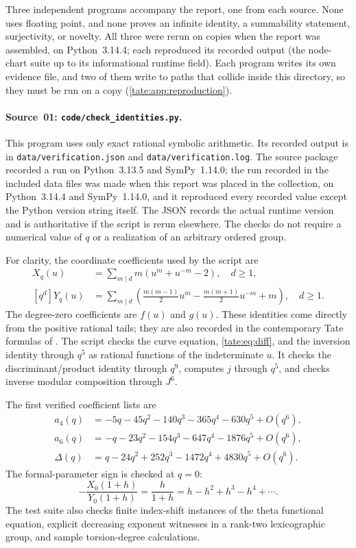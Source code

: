 \documentclass[11pt,letterpaper]{article}
\theoremstyle{definition}
\newcommand{\file}[1]{\nolinkurl{#1}}
\begin{document}
Three independent programs accompany the report, one from each source.
None uses floating point, and none proves an infinite identity, a
summability statement, surjectivity, or novelty. All three were rerun on
copies when the report was assembled, on Python~3.14.4; each reproduced its
recorded output (the node-chart suite up to its informational runtime
field). Each program writes its own evidence file, and two of them write to
paths that collide inside this directory, so they must be run on a copy
(\cref{tate:app:reproduction}).

\paragraph{Source~01: \texttt{code/check\_identities.py}.}
This program uses only
exact rational symbolic arithmetic. Its recorded output is in
\file{data/verification.json} and \file{data/verification.log}.
The source package recorded a run on Python~3.13.5 and SymPy~1.14.0; the
run recorded in the included data files was made when this report was
placed in the collection, on Python~3.14.4 and SymPy~1.14.0, and it
reproduced every recorded value except the Python version string itself.
The JSON records the actual
runtime version and is authoritative if the script is rerun elsewhere.
The checks do not require a numerical value of $q$ or a realization of
an arbitrary ordered group.

For clarity, the coordinate coefficients used by the script are
\begin{align}
 [q^d]X_q(u)&=\sum_{m\mid d}m(u^m+u^{-m}-2),\quad d\ge1,
 \label{tate:eq:Xcoeff}\\
 [q^d]Y_q(u)&=\sum_{m\mid d}
 \left(\frac{m(m-1)}2u^m-\frac{m(m+1)}2u^{-m}+m\right),\quad d\ge1.
 \label{tate:eq:Ycoeff}
\end{align}
The degree-zero coefficients are $f(u)$ and $g(u)$. These identities
come directly from the positive rational tails; they are also recorded
in the contemporary Tate formulas of \cite{EV}. The script checks the
curve equation, \eqref{tate:eq:diff}, and the inversion identity through
$q^5$ as rational functions of the indeterminate $u$. It checks the
discriminant/product identity through $q^9$, computes $j$ through $q^5$,
and checks inverse modular composition through $J^6$.

The first verified coefficient lists are
\begin{align*}
 a_4(q)&=-5q-45q^2-140q^3-365q^4-630q^5+O(q^6),\\
 a_6(q)&=-q-23q^2-154q^3-647q^4-1876q^5+O(q^6),\\
 \Delta(q)&=q-24q^2+252q^3-1472q^4+4830q^5+O(q^6).
\end{align*}
The formal-parameter sign is checked at $q=0$:
\[
 -\frac{X_0(1+h)}{Y_0(1+h)}=\frac{h}{1+h}
                =h-h^2+h^3-h^4+\cdots.
\]
The test suite also checks finite index-shift instances of the theta
functional equation, explicit decreasing exponent witnesses in a
rank-two lexicographic group, and sample torsion-degree calculations.
\end{document}
